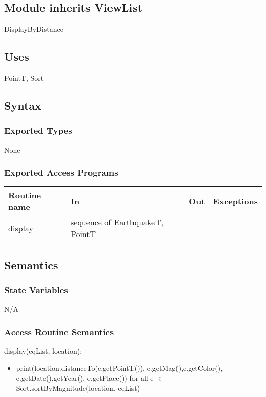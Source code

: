 \documentclass[12pt]{article}
\begin{document}
\subsection* {Module inherits ViewList}

DisplayByDistance

\subsection* {Uses}

PointT, Sort

\subsection* {Syntax}

\subsubsection* {Exported Types}

None


\subsubsection* {Exported Access Programs}

\begin{tabular}{| l | l | l | p{6cm} |}
\hline
\textbf{Routine name} & \textbf{In} & \textbf{Out} & \textbf{Exceptions}\\
\hline
display & sequence of EarthquakeT, PointT &  &  ~\\
\hline
\end{tabular}

\subsection* {Semantics}

\subsubsection* {State Variables}

N/A


\subsubsection* {Access Routine Semantics}

\noindent display(eqList, location):
\begin{itemize}
\item print(location.distanceTo(e.getPointT()), e.getMag(),e.getColor(), e.getDate().getYear(), e.getPlace()) for all e $\in$ Sort.sortByMagnitude(location, eqList)
\end{itemize}
\end{document}
